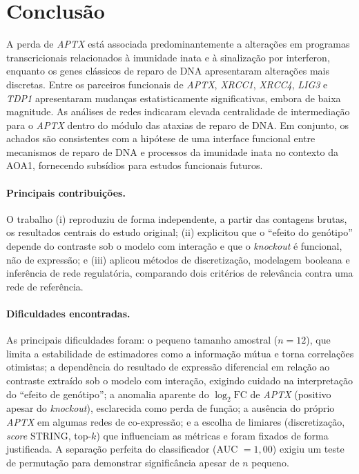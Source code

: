 \documentclass[10pt,letterpaper]{article}
\newcommand{\gene}[1]{\textit{#1}}
\newcommand{\logfc}{\ensuremath{\log_2\mathrm{FC}}}
\begin{document}
\section*{Conclusão}

A perda de \gene{APTX} está associada predominantemente a alterações em programas
transcricionais relacionados à imunidade inata e à sinalização por interferon,
enquanto os genes clássicos de reparo de DNA apresentaram alterações mais
discretas. Entre os parceiros funcionais de \gene{APTX}, \gene{XRCC1},
\gene{XRCC4}, \gene{LIG3} e \gene{TDP1} apresentaram mudanças estatisticamente
significativas, embora de baixa magnitude. As análises de redes indicaram
elevada centralidade de intermediação para o \gene{APTX} dentro do módulo das
ataxias de reparo de DNA. Em conjunto, os achados são
consistentes com a hipótese de uma interface funcional entre mecanismos de reparo
de DNA e processos da imunidade inata no contexto da AOA1, fornecendo subsídios
para estudos funcionais futuros.

\paragraph{Principais contribuições.} O trabalho (i) reproduziu de forma
independente, a partir das contagens brutas, os resultados centrais do estudo
original; (ii) explicitou que o ``efeito do genótipo'' depende do contraste sob o
modelo com interação e que o \emph{knockout} é funcional, não de expressão; e
(iii) aplicou métodos de discretização, modelagem
booleana e inferência de rede regulatória, comparando dois critérios de
relevância contra uma rede de referência.

\paragraph{Dificuldades encontradas.} As principais dificuldades foram: o pequeno
tamanho amostral (\(n=12\)), que limita a estabilidade de estimadores como a
informação mútua e torna correlações otimistas; a dependência do resultado de
expressão diferencial em relação ao contraste extraído sob o modelo com
interação, exigindo cuidado na interpretação do ``efeito de genótipo''; a
anomalia aparente do \logfc{} de \gene{APTX} (positivo apesar do \emph{knockout}),
esclarecida como perda de função; a ausência do próprio \gene{APTX} em algumas
redes de co-expressão; e a escolha de limiares (discretização, \emph{score}
STRING, top-\(k\)) que influenciam as métricas e foram fixados de forma
justificada. A separação perfeita do classificador (AUC \(=1{,}00\)) exigiu um
teste de permutação para demonstrar significância apesar de \(n\) pequeno.
\end{document}
